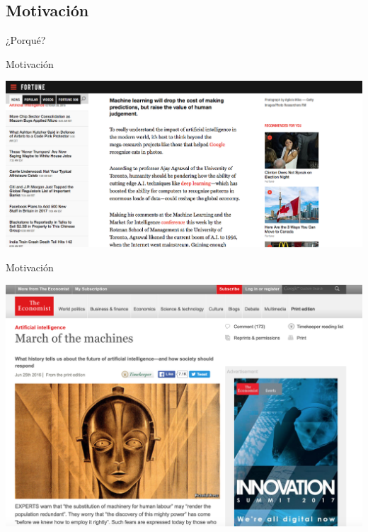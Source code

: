 \documentclass{beamer}
\begin{document}
\subsection{Motivación}
\begin{frame}
    \begin{center}
        \large ¿Porqué?
    \end{center}
\end{frame}
\begin{frame}{Motivación}
    \begin{center}
        \includegraphics[width=\linewidth]{Images/ml1}
    \end{center}
\end{frame}

\begin{frame}{Motivación}
    \begin{center}
        \includegraphics[width=\linewidth]{Images/ml2}
    \end{center}
\end{frame}
\end{document}
